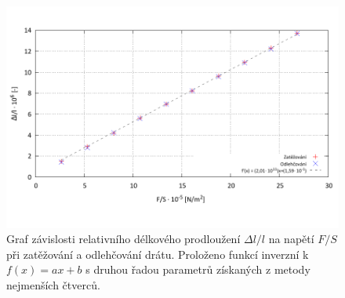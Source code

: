\documentclass[english]{article}
\begin{document}
	\begin{figure}[h!]
	\begin{center}
	\vspace*{-1.5cm}
	    \includegraphics[width=\linewidth]{../gnuplot/data_f1.pdf}
	    \vspace*{-1.5cm}
	    	\caption{Graf závislosti relativního délkového prodloužení $\Delta l/l$ na napětí $F/S$ při zatěžování a odlehčování drátu. Proloženo funkcí inverzní k $f(x) = ax+b$ s druhou řadou parametrů získaných z metody nejmenších čtverců.}
			\label{fig:f_1}
	\end{center}
	\end{figure}
\end{document}

